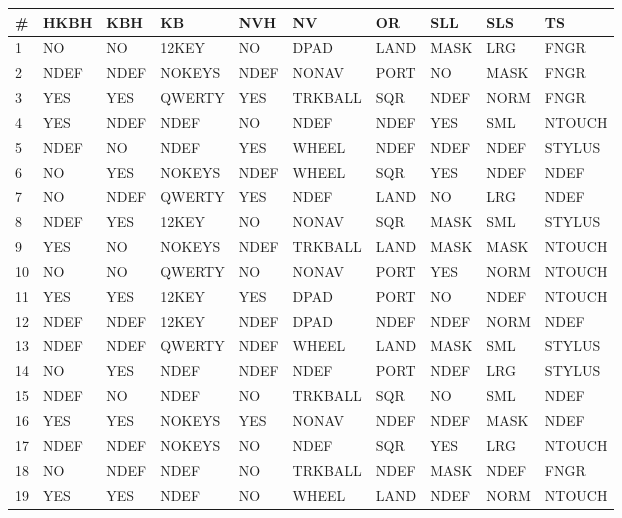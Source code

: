 \documentclass[12pt, letterpaper, titlepage]{article}
\begin{document}
\scriptsize
\begin{tabularx}{\textwidth}{|X|X|X|X|X|X|X|X|X|X|}
    \caption{Results from Python using pairwise testing} \\ \hline
    \textbf{\#} & \textbf{HKBH} & \textbf{KBH} & \textbf{KB} & \textbf{NVH} & \textbf{NV} & \textbf{OR} & \textbf{SLL} & \textbf{SLS} & \textbf{TS} \\ \hline
    1 & NO & NO & 12KEY & NO & DPAD & LAND & MASK & LRG & FNGR \\ \hline
    2 & NDEF & NDEF & NOKEYS & NDEF & NONAV & PORT & NO & MASK & FNGR \\ \hline
    3 & YES & YES & QWERTY & YES & TRKBALL & SQR & NDEF & NORM & FNGR \\ \hline
    4 & YES & NDEF & NDEF & NO & NDEF & NDEF & YES & SML & NTOUCH \\ \hline
    5 & NDEF & NO & NDEF & YES & WHEEL & NDEF & NDEF & NDEF & STYLUS \\ \hline
    6 & NO & YES & NOKEYS & NDEF & WHEEL & SQR & YES & NDEF & NDEF \\ \hline
    7 & NO & NDEF & QWERTY & YES & NDEF & LAND & NO & LRG & NDEF \\ \hline
    8 & NDEF & YES & 12KEY & NO & NONAV & SQR & MASK & SML & STYLUS \\ \hline
    9 & YES & NO & NOKEYS & NDEF & TRKBALL & LAND & MASK & MASK & NTOUCH \\ \hline
    10 & NO & NO & QWERTY & NO & NONAV & PORT & YES & NORM & NTOUCH \\ \hline
    11 & YES & YES & 12KEY & YES & DPAD & PORT & NO & NDEF & NTOUCH \\ \hline
    12 & NDEF & NDEF & 12KEY & NDEF & DPAD & NDEF & NDEF & NORM & NDEF \\ \hline
    13 & NDEF & NDEF & QWERTY & NDEF & WHEEL & LAND & MASK & SML & STYLUS \\ \hline
    14 & NO & YES & NDEF & NDEF & NDEF & PORT & NDEF & LRG & STYLUS \\ \hline
    15 & NDEF & NO & NDEF & NO & TRKBALL & SQR & NO & SML & NDEF \\ \hline
    16 & YES & YES & NOKEYS & YES & NONAV & NDEF & NDEF & MASK & NDEF \\ \hline
    17 & NDEF & NDEF & NOKEYS & NO & NDEF & SQR & YES & LRG & NTOUCH \\ \hline
    18 & NO & NDEF & NDEF & NO & TRKBALL & NDEF & MASK & NDEF & FNGR \\ \hline
    19 & YES & YES & NDEF & NO & WHEEL & LAND & NDEF & NORM & NTOUCH \\ \hline

\end{tabularx}
\end{document}
